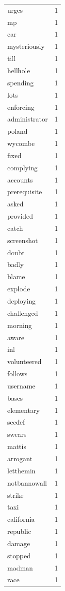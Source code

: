 \begin{tabular}{lr}
urges & 1 \\
mp & 1 \\
car & 1 \\
mysteriously & 1 \\
till & 1 \\
hellhole & 1 \\
spending & 1 \\
lots & 1 \\
enforcing & 1 \\
administrator & 1 \\
poland & 1 \\
wycombe & 1 \\
fixed & 1 \\
complying & 1 \\
accounts & 1 \\
prerequisite & 1 \\
asked & 1 \\
provided & 1 \\
catch & 1 \\
screenshot & 1 \\
doubt & 1 \\
badly & 1 \\
blame & 1 \\
explode & 1 \\
deploying & 1 \\
challenged & 1 \\
morning & 1 \\
aware & 1 \\
inl & 1 \\
volunteered & 1 \\
follows & 1 \\
username & 1 \\
bases & 1 \\
elementary & 1 \\
secdef & 1 \\
swears & 1 \\
mattis & 1 \\
arrogant & 1 \\
letthemin & 1 \\
notbannowall & 1 \\
strike & 1 \\
taxi & 1 \\
california & 1 \\
republic & 1 \\
damage & 1 \\
stopped & 1 \\
madman & 1 \\
race & 1 \\

\end{tabular}
